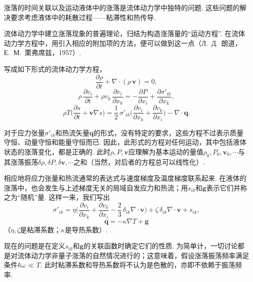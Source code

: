 涨落的时间关联以及运动液体中的涨落是流体动力学中独特的问题. 这些问题的解决要求考虑液体中的耗散过程——粘滞性和热传导.

流体动力学中建立涨落现象的普遍理论，归结为构造涨落量的“运动方程”. 在流体动力学方程中，用引入相应的附加项的方法，便可以做到这一点（Л.~Д.~朗道，Е.~М.~栗弗席兹，1957）.

写成如下形式的流体动力学方程，
\begin{equation}
\frac{\partial\rho}{\partial t}+\nabla\cdot(\rho\,\bm{v})=0,
\end{equation}
\begin{equation}
\rho\,\frac{\partial v_{i}}{\partial t}+\rho v_{k}\,\frac{\partial v_{i}}{\partial x_{k}}=-\frac{\partial P}{\partial x_{i}}+\frac{\partial{\sigma'}_{ik}}{\partial x_{k}},
\end{equation}
\begin{equation}
\rho T\biggl(\frac{\partial s}{\partial t}+\bm{v}\nabla s\biggr)=\frac{1}{2}\,{\sigma'}_{ik}\biggl(\frac{\partial v_{i}}{\partial x_{k}}+\frac{\partial v_{k}}{\partial x_{i}}\biggr)-\nabla\cdot\bm{q}.
\end{equation}

对于应力张量${\sigma'}_{ik}$和热流矢量$\bm{q}$的形式，没有特定的要求，这些方程不过表示质量守恒、动量守恒和能量守恒而已. 因此，此形式的方程对任何运动，其中包括液体状态的涨落变化，都是正确的. 此时$\rho,P,\bm{v}$应理解为基本运动的量值$\rho_{0},P_{0},\bm{v}_{0},\cdots$与其涨落振荡$\delta\rho,\delta P,\delta\bm{v},\cdots$之和（当然，对后者的方程总可以线性化）.

相应地将应力张量和热流通常的表达式与速度梯度及温度梯度联系起来. 在液体的涨落中，也会发生与上述梯度无关的局域自发应力和热流；用$s_{ik}$和$\bm{g}$表示它们并称之为“随机”量. 这样一来，我们写出
\begin{equation}
{\sigma'}_{ik}=\eta\biggl(\frac{\partial v_{i}}{\partial x_{k}}+\frac{\partial v_{k}}{\partial x_{i}}-\frac{2}{3}\,\delta_{ik}\nabla\cdot\bm{v}\biggr)+\zeta\,\delta_{ik}\nabla\cdot\bm{v}+s_{ik},
\end{equation}
\begin{equation}
\bm{q}=-\kappa\nabla T+\bm{g}
\end{equation}
（$\eta,\zeta$是粘滞系数；$\kappa$是导热系数）.

现在的问题是在定义$s_{ik}$和$\bm{g}$的关联函数时确定它们的性质. 为简单计，一切讨论都是对流体动力学非量子涨落的自然情况进行的；这意味着，假设涨落振荡频率满足条件$\hbar\omega\ll T$. 此时粘滞系数和导热系数将不认为是色散的，亦即不依赖于振荡频率.

